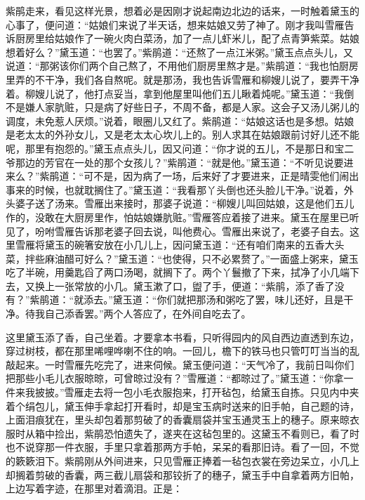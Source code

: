 \begin{parag}
    紫鹃走来，看见这样光景，想着必是因刚才说起南边北边的话来，一时触着黛玉的心事了，便问道：“姑娘们来说了半天话，想来姑娘又劳了神了。刚才我叫雪雁告诉厨房里给姑娘作了一碗火肉白菜汤，加了一点儿虾米儿，配了点青笋紫菜。姑娘想着好么？”黛玉道：“也罢了。”紫鹃道：“还熬了一点江米粥。”黛玉点点头儿，又说道：“那粥该你们两个自己熬了，不用他们厨房里熬才是。”紫鹃道：“我也怕厨房里弄的不干净，我们各自熬呢。就是那汤，我也告诉雪雁和柳嫂儿说了，要弄干净着。柳嫂儿说了，他打点妥当，拿到他屋里叫他们五儿瞅着炖呢。”黛玉道：“我倒不是嫌人家肮赃，只是病了好些日子，不周不备，都是人家。这会子又汤儿粥儿的调度，未免惹人厌烦。”说着，眼圈儿又红了。紫鹃道：“姑娘这话也是多想。姑娘是老太太的外孙女儿，又是老太太心坎儿上的。别人求其在姑娘跟前讨好儿还不能呢，那里有抱怨的。”黛玉点点头儿，因又问道：“你才说的五儿，不是那日和宝二爷那边的芳官在一处的那个女孩儿？”紫鹃道：“就是他。”黛玉道：“不听见说要进来么？”紫鹃道：“可不是，因为病了一场，后来好了才要进来，正是晴雯他们闹出事来的时候，也就耽搁住了。”黛玉道：“我看那丫头倒也还头脸儿干净。”说着，外头婆子送了汤来。雪雁出来接时，那婆子说道：“柳嫂儿叫回姑娘，这是他们五儿作的，没敢在大厨房里作，怕姑娘嫌肮赃。”雪雁答应着接了进来。黛玉在屋里已听见了，吩咐雪雁告诉那老婆子回去说，叫他费心。雪雁出来说了，老婆子自去。这里雪雁将黛玉的碗箸安放在小几儿上，因问黛玉道：“还有咱们南来的五香大头菜，拌些麻油醋可好么？”黛玉道：“也使得，只不必累赘了。”一面盛上粥来，黛玉吃了半碗，用羹匙舀了两口汤喝，就搁下了。两个丫鬟撤了下来，拭净了小几端下去，又换上一张常放的小几。黛玉漱了口，盥了手，便道：“紫鹃，添了香了没有？”紫鹃道：“就添去。”黛玉道：“你们就把那汤和粥吃了罢，味儿还好，且是干净。待我自己添香罢。”两个人答应了，在外间自吃去了。
\end{parag}


\begin{parag}
    这里黛玉添了香，自己坐着。才要拿本书看，只听得园内的风自西边直透到东边，穿过树枝，都在那里唏哩哗喇不住的响。一回儿，檐下的铁马也只管叮叮当当的乱敲起来。一时雪雁先吃完了，进来伺候。黛玉便问道：“天气冷了，我前日叫你们把那些小毛儿衣服晾晾，可曾晾过没有？”雪雁道：“都晾过了。”黛玉道：“你拿一件来我披披。”雪雁走去将一包小毛衣服抱来，打开毡包，给黛玉自拣。只见内中夹着个绢包儿，黛玉伸手拿起打开看时，却是宝玉病时送来的旧手帕，自己题的诗，上面泪痕犹在，里头却包着那剪破了的香囊扇袋并宝玉通灵玉上的穗子。原来晾衣服时从箱中捡出，紫鹃恐怕遗失了，遂夹在这毡包里的。这黛玉不看则已，看了时也不说穿那一件衣服，手里只拿着那两方手帕，呆呆的看那旧诗。看了一回，不觉的簌簌泪下。紫鹃刚从外间进来，只见雪雁正捧着一毡包衣裳在旁边呆立，小几上却搁着剪破的香囊，两三截儿扇袋和那铰折了的穗子，黛玉手中自拿着两方旧帕，上边写着字迹，在那里对着滴泪。正是：
\end{parag}


